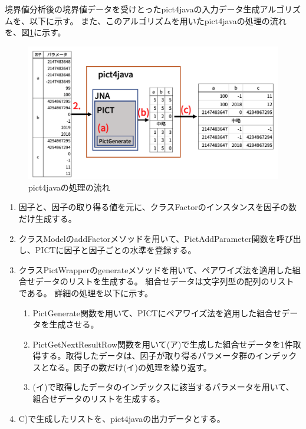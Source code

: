 \documentclass[uplatex, report, a4j, 10pt]{jsbook}
\begin{document}
境界値分析後の境界値データを受けとったpict4javaの入力データ生成アルゴリズムを、以下に示す。
また、このアルゴリズムを用いたpict4javaの処理の流れを、図\ref{fig:pict4java}に示す。

\begin{figure}[tp]
  \centering
  \includegraphics[keepaspectratio, width=160mm]{figs/pict4java}
  \caption{pict4javaの処理の流れ}
  \label{fig:pict4java}
\end{figure}

\begin{enumerate}
  \item 因子と、因子の取り得る値を元に、クラスFactorのインスタンスを因子の数だけ生成する。
  \item クラスModelのaddFactorメソッドを用いて、PictAddParameter関数を呼び出し、PICTに因子と因子ごとの水準を登録する。
  \item クラスPictWrapperのgenerateメソッドを用いて、ペアワイズ法を適用した組合せデータのリストを生成する。
        組合せデータは文字列型の配列のリストである。
        詳細の処理を以下に示す。
        \begin{enumerate}
          \item PictGenerate関数を用いて、PICTにペアワイズ法を適用した組合せデータを生成させる。
          \item PictGetNextResultRow関数を用いて(ア)で生成した組合せデータを1件取得する。取得したデータは、因子が取り得るパラメータ群のインデックスとなる。因子の数だけ(イ)の処理を繰り返す。
          \item (イ)で取得したデータのインデックスに該当するパラメータを用いて、組合せデータのリストを生成する。
        \end{enumerate}
  \item C)で生成したリストを、pict4javaの出力データとする。
\end{enumerate}
\end{document}

